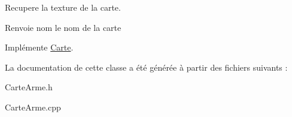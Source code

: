 \-Recupere la texture de la carte. 

\begin{DoxyReturn}{\-Renvoie}
nom le nom de la carte 
\end{DoxyReturn}


\-Implémente \hyperlink{classCarte_ad881bc9e55ab5feb4884d0efdcbf46ed}{\-Carte}.



\-La documentation de cette classe a été générée à partir des fichiers suivants \-:\begin{DoxyCompactItemize}
\item 
\-Carte\-Arme.\-h\item 
\-Carte\-Arme.\-cpp\end{DoxyCompactItemize}
